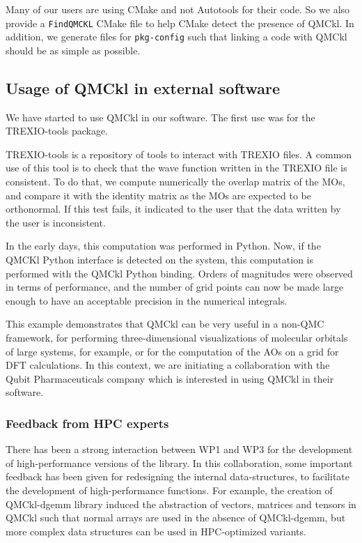 Many of our users are using CMake and not Autotools for their code. So
we also provide a \texttt{FindQMCKL} CMake file to help CMake detect
the presence of QMCkl. In addition, we generate files for
\texttt{pkg-config} such that linking a code with QMCkl should be as
simple as possible.

\subsection{Usage of QMCkl in external software}

We have started to use QMCkl in our software. The first use was for
the TREXIO-tools package.

TREXIO-tools is a repository of tools to interact with TREXIO files. A
common use of this tool is to check that the wave function written in
the TREXIO file is consistent. To do that, we compute numerically the
overlap matrix of the \acp{MO}, and compare it with the identity
matrix as the \acp{MO} are expected to be orthonormal. If this test
fails, it indicated to the user that the data written by the user is
inconsistent.

In the early days, this computation was performed in Python. Now, if
the QMCKl Python interface is detected on the system, this computation
is performed with the QMCkl Python binding. Orders of magnitudes were
observed in terms of performance, and the number of grid points can
now be made large enough to have an acceptable precision in the
numerical integrals.

This example demonstrates that QMCkl can be very useful in a non-QMC
framework, for performing three-dimensional visualizations of molecular
orbitals of large systems, for example, or for the computation of the
\acp{AO} on a grid for \ac{DFT} calculations. In this context, we are
initiating a collaboration with the Qubit Pharmaceuticals company
which is interested in using QMCkl in their software.

\subsubsection{Feedback from HPC experts}

There has been a strong interaction between WP1 and WP3 for the
development of high-performance versions of the library. In this
collaboration, some important feedback has been given for redesigning
the internal data-structures, to facilitate the development of
high-performance functions. 
For example, the creation of QMCkl-dgemm library induced the
abstraction of vectors, matrices and tensors in QMCkl such that normal
arrays are used in the absence of QMCkl-dgemm, but more complex data
structures can be used in HPC-optimized variants.


